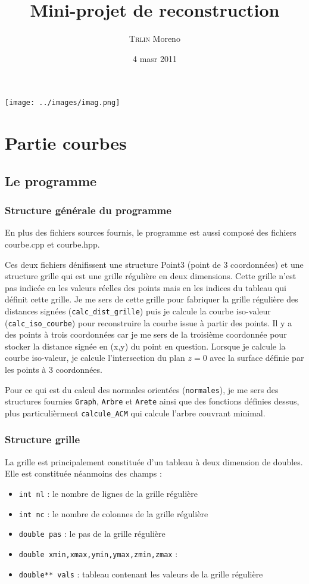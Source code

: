 \documentclass[11pt,a4paper]{article}
\title{
  \huge{\bf Mini-projet de reconstruction}
}
\author{
    \textsc{Trlin} Moreno \\
}
\date{4 masr 2011}
\begin{document}
 \maketitle
  \begin{center}
   \texttt{[image: ../images/imag.png]}

  \end{center}
 \tableofcontents

\pagebreak

\section{Partie courbes}
\subsection{Le programme}
\subsubsection{Structure générale du programme}
En plus des fichiers sources fournis, le programme est aussi composé des fichiers courbe.cpp et courbe.hpp.

Ces deux fichiers dénifissent une structure Point3 (point de 3 coordonnées) et une structure grille qui est une grille régulière en deux dimensions.
Cette grille n'est pas indicée en les valeurs réelles des points mais en les indices du tableau qui définit cette grille.
Je me sers de cette grille pour fabriquer la grille régulière des distances signées ({\tt calc\_dist\_grille}) puis je calcule la courbe
iso-valeur ({\tt calc\_iso\_courbe}) pour reconstruire la courbe issue à partir des points. Il y a des points à trois coordonnées car je me sers
de la troisième coordonnée pour stocker la distance signée en (x,y) du point en question. Lorsque je calcule la courbe iso-valeur, je calcule l'intersection
du plan $z=0$ avec la surface définie par les points à 3 coordonnées.

Pour ce qui est du calcul des normales orientées ({\tt normales}), je me sers des structures fournies {\tt Graph}, {\tt Arbre} et {\tt Arete} ainsi que
des fonctions définies dessus, plus particulièrment {\tt calcule\_ACM} qui calcule l'arbre couvrant minimal.

\subsubsection{Structure grille}
La grille est principalement constituée d'un tableau à deux dimension de doubles. Elle est constituée néanmoins des champs :
\begin{itemize}
\item {\tt int nl} : le nombre de lignes de la grille régulière
\item {\tt int nc} : le nombre de colonnes de la grille régulière
\item {\tt double pas} : le pas de la grille régulière
\item {\tt double xmin,xmax,ymin,ymax,zmin,zmax} :
\item {\tt double** vals} : tableau contenant les valeurs de la grille régulière
\end{itemize}
\end{document}
